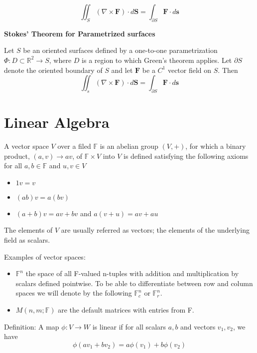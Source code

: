 \documentclass[11pt,twoside]{book}
\newcommand{\goesto}{\rightarrow}
\newcommand{\RR}{\mathbb{R}}
\begin{document}
\[
	\iint_S (\nabla \times \textbf{F}) \cdot d \textbf{S} = \int_{\partial S} \textbf{F} \cdot d \textbf{s}
\]


\textbf{Stokes' Theorem for Parametrized surfaces}

Let $S$ be an oriented surfaces defined by a one-to-one parametrization $\Phi :D \subset \RR^2 \goesto S$, where $D$ is a region to which Green's theorem applies. Let $\partial S$ denote the oriented boundary of $S$ and let $\textbf{F}$ be a $C^1$ vector field on $S$. Then
\[
	\iint_s (\nabla \times \textbf{F}) \cdot d \textbf{S} = \int_{\partial S} \textbf{F} \cdot d \textbf{s}
\]


\chapter{Linear Algebra}

A vector space $V$ over a filed $\mathbb{F}$ is an abelian group $(V,+)$, for which a binary product, $(a,v) \rightarrow av$, of $ \mathbb{F} \times V$ into $V$ is defined satisfying the following axioms for all $a,b \in \mathbb{F}$ and $u,v \in V$

\begin{itemize}
    \item $1v = v$
    \item $(ab)v = a(bv) $
    \item $(a + b)v = av + bv$ and $a(v+u) = av + au$
\end{itemize}

The elements of $V$ are usually referred as vectors; the elements of the underlying field as scalars.

Examples of vector spaces:

\begin{itemize}
	\item $\mathbb{F}^n $ the space of all F-valued n-tuples with addition and multiplication by scalars defined pointwise. To be able to differentiate between row and column spaces we will denote by the following $\mathbb{F}_c^n$ or $\mathbb{F}_r^n$.
	\item $M(n,m;\mathbb{F})$ are the default matrices with entries from F. 
\end{itemize}

Definition: A map $\phi: V \rightarrow W$ is linear if for all scalars $a,b$ and vectors $v_1, v_2$, we have
\begin{equation*}
	\phi(av_1 + b v_2) = a \phi(v_1) + b \phi(v_2)
\end{equation*}
\end{document}
